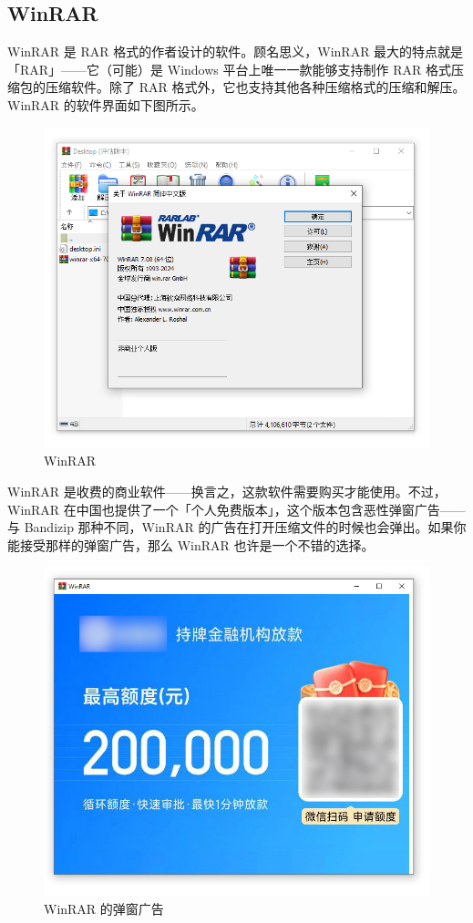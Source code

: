 {{{{\subsection{WinRAR}

WinRAR 是 RAR 格式的作者设计的软件。顾名思义，WinRAR 最大的特点就是「RAR」——它（可能）是 Windows 平台上唯一一款能够支持制作 RAR 格式压缩包的压缩软件。除了 RAR 格式外，它也支持其他各种压缩格式的压缩和解压。WinRAR 的软件界面如下图所示。

\begin{figure}[htb!]
  \centering
  \includegraphics[width=.6\textwidth]{assets/software/WinRAR_main_window.png}
  \caption{WinRAR}
  \label{fig:WinRAR_main_window}
\end{figure}

WinRAR 是收费的商业软件——换言之，这款软件需要购买才能使用。不过，WinRAR 在中国也提供了一个「个人免费版本」，这个版本包含恶性弹窗广告——与 Bandizip 那种不同，WinRAR 的广告在打开压缩文件的时候也会弹出。如果你能接受那样的弹窗广告，那么 WinRAR 也许是一个不错的选择。

\begin{figure}[htb!]
  \centering
  \includegraphics[width=.5\textwidth]{assets/software/WinRAR_ad.png}
  \caption{WinRAR 的弹窗广告}
  \label{fig:WinRAR_ad}
\end{figure}

}}}}
